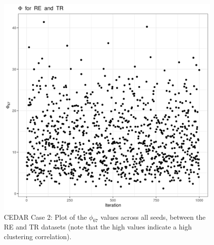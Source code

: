 \documentclass[12pt]{article} %
\begin{document}
	\begin{figure}[h]
		\centering
		\includegraphics[scale=0.75]{Images/Biology_data/Set_1000/All_datasets/Phi_series_plots/file_1_Phi_67.png}
		\caption{CEDAR Case 2: Plot of the $\phi_{67}$ values across all seeds, between the RE and TR datasets (note that the high values indicate a high clustering correlation).}
		\label{fig:results:cedar_2:mdi_re_tr_phi_series_plot}
	\end{figure}
	
	
\end{document}
